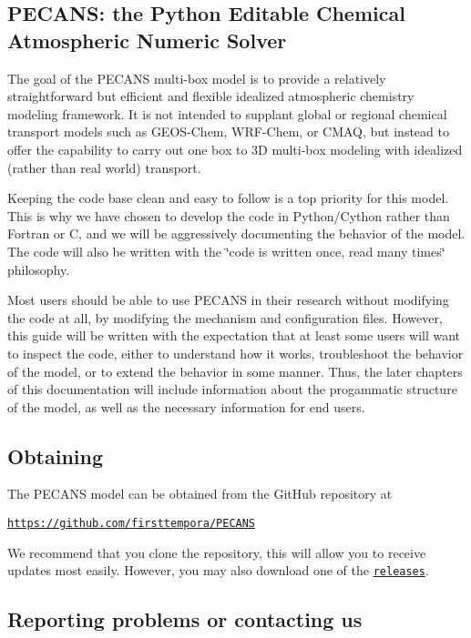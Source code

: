 \subsection*{P\+E\+C\+A\+NS\+: the Python Editable Chemical Atmospheric Numeric Solver}

The goal of the P\+E\+C\+A\+NS multi-\/box model is to provide a relatively straightforward but efficient and flexible idealized atmospheric chemistry modeling framework. It is not intended to supplant global or regional chemical transport models such as G\+E\+O\+S-\/\+Chem, W\+R\+F-\/\+Chem, or C\+M\+AQ, but instead to offer the capability to carry out one box to 3D multi-\/box modeling with idealized (rather than real world) transport.

Keeping the code base clean and easy to follow is a top priority for this model. This is why we have chosen to develop the code in Python/\+Cython rather than Fortran or C, and we will be aggressively documenting the behavior of the model. The code will also be written with the \char`\"{}code is written once, read many times\char`\"{} philosophy.

Most users should be able to use P\+E\+C\+A\+NS in their research without modifying the code at all, by modifying the mechanism and configuration files. However, this guide will be written with the expectation that at least some users will want to inspect the code, either to understand how it works, troubleshoot the behavior of the model, or to extend the behavior in some manner. Thus, the later chapters of this documentation will include information about the progammatic structure of the model, as well as the necessary information for end users.

\subsection*{Obtaining}

The P\+E\+C\+A\+NS model can be obtained from the Git\+Hub repository at

\href{https://github.com/firsttempora/PECANS}{\tt https\+://github.\+com/firsttempora/\+P\+E\+C\+A\+NS}

We recommend that you clone the repository, this will allow you to receive updates most easily. However, you may also download one of the \href{https://github.com/firsttempora/PECANS/releases}{\tt releases}.

\subsection*{Reporting problems or contacting us}


